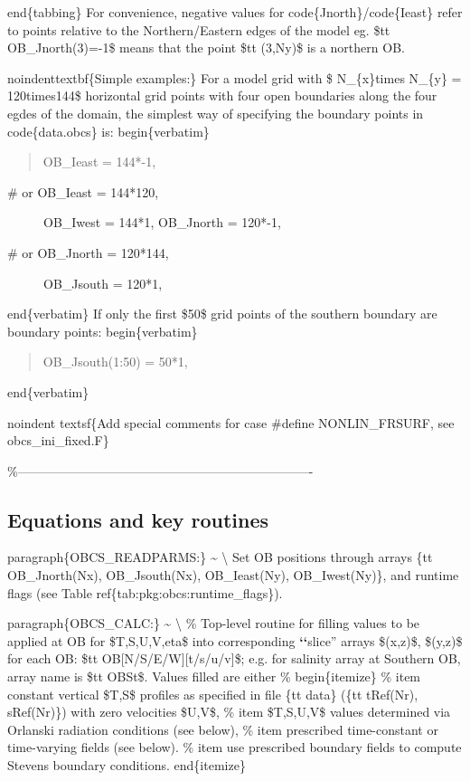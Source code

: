 \documentclass[letterpaper,10pt,english]{sphinxmanual}
\begin{document}
end\{tabbing\}
For convenience, negative values for code\{Jnorth\}/code\{Ieast\} refer to
points relative to the Northern/Eastern edges of the model
eg. \$tt OB\_Jnorth(3)=-1\$  means that the point \$tt (3,Ny)\$
is a northern OB.

noindenttextbf\{Simple examples:\} For a model grid with \$ N\_\{x\}times
N\_\{y\} = 120times144\$ horizontal grid points with four open boundaries
along the four egdes of the domain, the simplest way of specifying the
boundary points in code\{data.obcs\} is:
begin\{verbatim\}
\begin{quote}

OB\_Ieast = 144*-1,
\end{quote}
\begin{description}
\item[{\# or OB\_Ieast = 144*120,}] \leavevmode
OB\_Iwest = 144*1,
OB\_Jnorth = 120*-1,

\item[{\# or OB\_Jnorth = 120*144,}] \leavevmode
OB\_Jsouth = 120*1,

\end{description}

end\{verbatim\}
If only the first \$50\$ grid points of the southern boundary are
boundary points:
begin\{verbatim\}
\begin{quote}

OB\_Jsouth(1:50) = 50*1,
\end{quote}

end\{verbatim\}

noindent
textsf\{Add special comments for case \#define NONLIN\_FRSURF,
see obcs\_ini\_fixed.F\}

\%----------------------------------------------------------------------


\subsection{Equations and key routines}
\label{\detokenize{phys_pkgs/phys_pkgs:equations-and-key-routines}}
paragraph\{OBCS\_READPARMS:\} \textasciitilde{} \textbackslash{}
Set OB positions through arrays
\{tt OB\_Jnorth(Nx), OB\_Jsouth(Nx), OB\_Ieast(Ny), OB\_Iwest(Ny)\},
and runtime flags (see Table ref\{tab:pkg:obcs:runtime\_flags\}).

paragraph\{OBCS\_CALC:\} \textasciitilde{} \textbackslash{}
\%
Top-level routine for filling values to be applied at OB for
\$T,S,U,V,eta\$ into corresponding
{\color{red}\bfseries{}{}`{}`}slice'' arrays \$(x,z)\$, \$(y,z)\$ for each OB:
\$tt OB{[}N/S/E/W{]}{[}t/s/u/v{]}\$; e.g. for salinity array at
Southern OB, array name is \$tt OBSt\$.
Values filled are either
\%
begin\{itemize\}
\%
item
constant vertical \$T,S\$ profiles as specified in file
\{tt data\} (\{tt tRef(Nr), sRef(Nr)\}) with zero velocities \$U,V\$,
\%
item
\$T,S,U,V\$ values determined via Orlanski radiation conditions
(see below),
\%
item
prescribed time-constant or time-varying fields (see below).
\%
item
use prescribed boundary fields to compute Stevens boundary conditions.
end\{itemize\}
\end{document}
